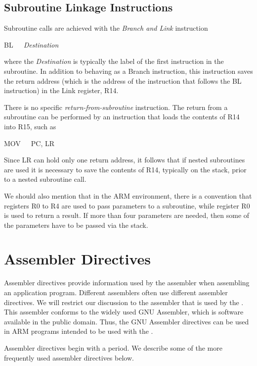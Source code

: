 \documentclass[11pt, twoside, pdftex]{article}
\begin{document}
\subsection{Subroutine Linkage Instructions}
\label{sec:linkage}

Subroutine calls are achieved with the {\it Branch and Link} instruction
\begin{center}
		  BL~~~{\it Destination}
\end{center}
\noindent
where the {\it Destination} is typically the label of the first
instruction in the subroutine.
In addition to behaving as a Branch instruction,
this instruction saves the return address (which is the address
of the instruction that follows the BL instruction) in the Link
register, R14.

There is no specific {\it return-from-subroutine} instruction.
The return from a subroutine can be performed by
an instruction that loads the contents of R14 into R15, such as
\begin{center}
MOV~~~PC, LR
\end{center}
\noindent
Since LR can hold only one return address, it follows that
if nested subroutines are used it is necessary to save the contents of R14, typically on the stack, prior to a nested subroutine call.

We should also mention that in the ARM environment, there is a
convention that registers R0 to R4 are used to pass parameters
to a subroutine, while register R0 is used to return a result.
If more than four parameters are needed, then some of the
parameters have to be passed via the stack.

\section{Assembler Directives}
\label{sec:directives}

Assembler directives provide information used by the assembler 
when assembling an application program.
Different assemblers often use different assembler directives.
We will restrict our discussion to the assembler
that is used by the \productNameMed{}. 
This assembler conforms to the widely used GNU Assembler, 
which is software available in the public domain. Thus, the 
GNU Assembler directives can be used in ARM programs intended
to be used with the \productNameMed{}. 

Assembler directives begin with a period. 
We describe some of the more frequently used assembler directives below.
\end{document}
